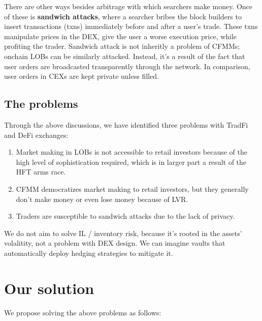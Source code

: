 \documentclass{article}
\begin{document}
There are other ways besides arbitrage with which searchers make money. Once of these is \textbf{sandwich attacks}, where a searcher bribes the block builders to insert transactions (txns) immediately before and after a user's trade. These txns manipulate prices in the DEX, give the user a worse execution price, while profiting the trader. Sandwich attack is not inheritly a problem of CFMMs; onchain LOBs can be similarly attacked. Instead, it's a result of the fact that user orders are broadcasted transparently through the network. In comparison, user orders in CEXs are kept private unless filled.

\subsection{The problems}

Through the above discussions, we have identified three problems with TradFi and DeFi exchanges:

\begin{enumerate}
  \item Market making in LOBs is not accessible to retail investors because of the high level of sophistication required, which is in larger part a result of the HFT arms race.
  \item CFMM democratizes market making to retail investors, but they generally don't make money or even lose money because of LVR.
  \item Traders are susceptible to sandwich attacks due to the lack of privacy.
\end{enumerate}

We do not aim to solve IL / inventory risk, because it's rooted in the assets' volalitity, not a problem with DEX design. We can imagine vaults that automatically deploy hedging strategies to mitigate it.

\section{Our solution}

We propose solving the above problems as follows:
\end{document}
